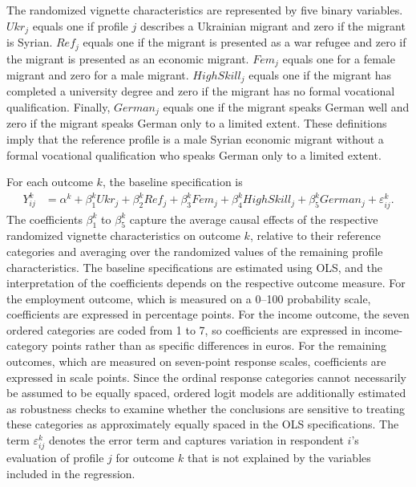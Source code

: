 The randomized vignette characteristics are represented by five binary variables. \(Ukr_j\) equals one if profile \(j\) 
describes a Ukrainian migrant and zero if the migrant is Syrian. \(Ref_j\) equals one if the migrant is presented as a 
war refugee and zero if the migrant is presented as an economic migrant. \(Fem_j\) equals one for a female migrant and 
zero for a male migrant. \(HighSkill_j\) equals one if the migrant has completed a university degree and zero if the 
migrant has no formal vocational qualification. Finally, \(German_j\) equals one if the migrant speaks German well and 
zero if the migrant speaks German only to a limited extent. These definitions imply that the reference profile 
is a male Syrian economic migrant without a formal vocational qualification who speaks German only to a limited extent.

For each outcome \(k\), the baseline specification is
\begin{equation}
\begin{aligned}
Y_{ij}^{k}
&= \alpha^{k}
+ \beta_{1}^{k} Ukr_{j}
+ \beta_{2}^{k} Ref_{j}
+ \beta_{3}^{k} Fem_{j}
+ \beta_{4}^{k} HighSkill_{j}
+ \beta_{5}^{k} German_{j}
+ \varepsilon_{ij}^{k}.
\end{aligned}
\label{eq:baseline}
\end{equation}
The coefficients \(\beta_1^k\) to \(\beta_5^k\) capture the average causal effects of the respective randomized vignette 
characteristics on outcome \(k\), relative to their reference categories and averaging over the randomized values of 
the remaining profile characteristics. The baseline specifications are estimated using OLS, and the interpretation of 
the coefficients depends on the respective outcome measure. For the employment outcome, which is 
measured on a 0–100 probability scale, coefficients are expressed in percentage points. For the income outcome, the 
seven ordered categories are coded from 1 to 7, so coefficients are expressed in income-category points rather than as 
specific differences in euros. For the remaining outcomes, which are measured on seven-point response scales, 
coefficients are expressed in scale points. Since the ordinal response categories cannot necessarily be assumed to 
be equally spaced, ordered logit models are additionally estimated as robustness checks to examine whether the 
conclusions are sensitive to treating these categories as approximately equally spaced in the OLS specifications.
The term \(\varepsilon_{ij}^{k}\) denotes the error term and captures variation in respondent \(i\)'s evaluation of 
profile \(j\) for outcome \(k\) that is not explained by the variables included in the regression.\bigskip


